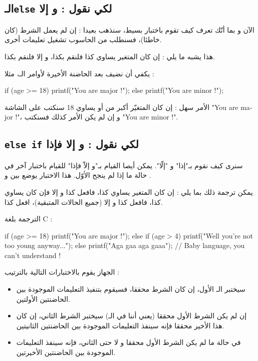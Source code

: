 \subsection{الـ\texttt{else}
لكي نقول : و إلا}

الآن و بما أنّك تعرف كيف تقوم باختبار بسيط، سنذهب بعيدا : إن لم يعمل الشرط (كان خاطئا)، فسنطلب من الحاسوب تشغيل تعليمات أخرى.

هذا يشبه ما يلي : إن كان المتغير يساوي كذا فلنقم بكذا، و إلا فلنقم بكذا.

يكفي أن نضيف
بعد الحاضنة الأخيرة لأوامر الـ،
مثلا :
\begin{Csource}
if (age >= 18)
{
	printf("You are major !");
}
else {
	printf("You are minor !");
}
\end{Csource}

الأمر سهل : إن كان المتغيّر
أكبر من أو يساوي 18 سنكتب على الشاشة 
"\textenglish{You are major !}"،
و إن لم يكن الأمر كذلك فسنكتب 
"\textenglish{You are minor !}".

\subsection{\texttt{else if}
لكي نقول : و إلا فإذا}

سنرى كيف نقوم بـ"إذا" و "إلّا". يمكن أيصا القيام بـ"و إلاّ فإذا" للقيام باختبار آخر في حالة ما إذا لم ينجح الأوّل. هذا الاختبار يوضع بين
و
.

يمكن ترجمة ذلك بما يلي : إن كان المتغير يساوي كذا، فافعل كذا و إلا فإن كان يساوي كذا، فافعل كذا و إلا (جميع الحالات المتبقية)، افعل كذا.

الترجمة بلغة
\textenglish{C} :

\begin{Csource}
if (age >= 18)
{
	printf("You are major !");
}
else if (age > 4)
{
	printf("Well you're not too young anyway...");
}
else
{
	printf("Aga gaa aga gaaa");
	// Baby language, you can’t understand !
}
\end{Csource}

الجهاز يقوم بالاختبارات التالية بالترتيب :
\begin{itemize}
\item سيختبر الـ
الأول، إن كان الشرط محققا، فسيقوم بتنفيذ التعليمات الموجودة بين الحاضنتين الأولتين.
\item إن لم يكن الشرط الأول محققا (يعني أننا في الـ)
سيختبر الشرط الثاني، إن كان هذا الأخير محققا فإنه سينفذ التعليمات الموجودة بين الحاضنتين الثانيتين.
\item في حالة ما لم يكن الشرط الأول محققا و لا حتى الثاني، فإنه سينفذ التعليمات الموجودة بين الحاضنتين الأخيرتين.
\end{itemize}

